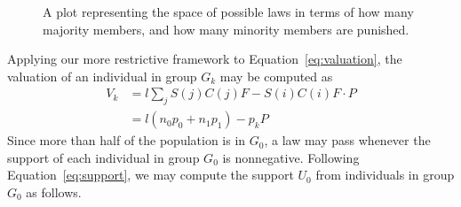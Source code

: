 \begin{figure}[htbp]
\begin{center}


\caption{A plot representing the space of possible laws in terms of how many majority members, and how many minority members are punished.}
\label{fig:criminals}
\end{center}
\end{figure}


Applying our more restrictive framework to Equation~\ref{eq:valuation}, the valuation of an individual in group $G_k$ may be computed as 
\begin{align}
V_k &= l \sum_j S(j) C(j) F - S(i)C(i)F\cdot P\\
&= l \left(n_0 p_0 + n_1 p_1\right) - p_k P
\end{align}
Since more than half of the population is in $G_0$, a law may pass whenever the support of each individual in group $G_0$ is nonnegative.  Following Equation~\ref{eq:support}, we may compute the support $U_0$ from individuals in group $G_0$ as follows.

